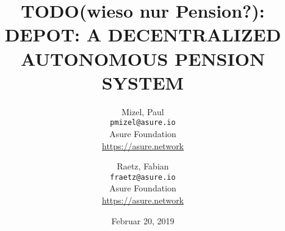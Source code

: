 
\title{TODO(wieso nur Pension?): DEPOT: A DECENTRALIZED AUTONOMOUS PENSION SYSTEM}
\author{
  Mizel, Paul\\
  \texttt{pmizel@asure.io}\\
  Asure Foundation \\ 
  {\url{https://asure.network}}\\
  \and
  Raetz, Fabian\\
  \texttt{fraetz@asure.io}\\
  Asure Foundation \\ 
  {\url{https://asure.network}}\\
}

\date{Februar 20, 2019}
\maketitle

